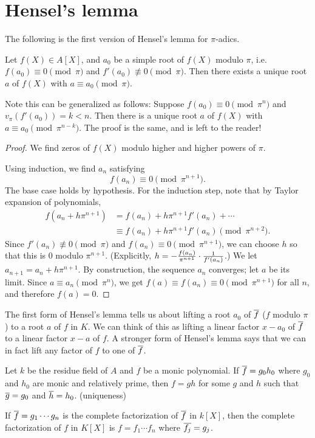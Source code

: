 \section{Hensel's lemma}
The following is the first version of Hensel's lemma for $\pi$-adics. 
\begin{lem}
Let $f(X)\in A[X]$, and $a_0$ be a simple root of $f(X)$ modulo $\pi$, i.e. $f(a_0)\equiv 0\pmod{\pi}$ and $f'(a_0)\nequiv 0\pmod{\pi}$. Then there exists a unique root $a$ of $f(X)$ with $a\equiv a_0\pmod{\pi}$.
\end{lem}
Note this can be generalized as follows: Suppose $f(a_0)\equiv 0\pmod{\pi^n}$ and $v_{\pi}(f'(a_0))=k<n$. Then there is a unique root $a$ of $f(X)$ with $a\equiv a_0\pmod{\pi^{n-k}}$. The proof is the same, and is left to the reader!
\begin{proof}
We find zeros of $f(X)$ modulo higher and higher powers of $\pi$.

Using induction, we find %
$a_n$ satisfying 
\[
f(a_n)\equiv 0\pmod{\pi^{n+1}}.
\]
The base case holds by hypothesis. For the induction step, note that by Taylor expansion of polynomials,
\begin{align*}
f(a_n+h\pi^{n+1})&=f(a_n)+h\pi^{n+1}f'(a_n)+\cdots\\
&\equiv f(a_n)+h\pi^{n+1}f'(a_n)\pmod{\pi^{n+2}}.
\end{align*}
Since $f'(a_n)\nequiv 0\pmod{\pi}$ and $f(a_n)\equiv 0\pmod{\pi^{n+1}}$, we can choose $h$ so that this is 0 modulo $\pi^{n+1}$. (Explicitly, $h=-\frac{f(a_n)}{\pi^{n+1}}\cdot \frac{1}{f'(a_n)}$.) We let $a_{n+1}=a_n+h\pi^{n+1}$. By construction, the sequence $a_n$ converges; let $a$ be its limit. Since $a\equiv a_n\pmod{\pi^n}$, we get $f(a)\equiv f(a_n)\equiv 0\pmod{\pi^{n+1}}$ for all $n$, and therefore $f(a)=0$.
\end{proof}
The first form of Hensel's lemma tells us about lifting a root $a_0$ of $\overline{f}$ ($f$ modulo $\pi$) to a root $a$ of $f$ in $K$. We can think of this as lifting a linear factor $x-a_0$ of $\overline{f}$ to a linear factor $x-a$ of $f$. A stronger form of Hensel's lemma says that we can in fact lift any factor of $f$ to one of $\overline{f}$.
\begin{thm}
Let $k$ be the residue field of $A$ and $f$ be a monic polynomial. If $\overline{f}=g_0h_0$ where $g_0$ and $h_0$ are monic and relatively prime, then $f=gh$ for some $g$ and $h$ such that $\overline{g}=g_0$ and $\overline{h}=h_0$. (uniqueness)

If $\overline{f}=g_1\cdots g_n$ is the complete factorization of $\overline{f}$ in $k[X]$, then the complete factorization of $f$ in $K[X]$ is $f=f_1\cdots f_n$ where $\overline{f_j}=g_j$.
\end{thm}
